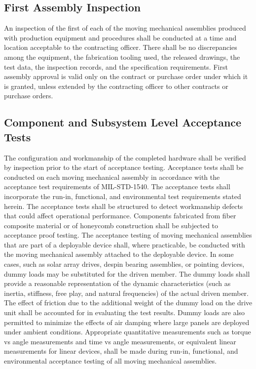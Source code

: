 \documentclass[12pt]{article}
\begin{document}
\subsection{First Assembly Inspection} %
An inspection of the first of each of the moving mechanical assemblies produced with production equipment and procedures shall be conducted at a time and location acceptable to the contracting officer. 
There shall be no discrepancies among the equipment, the fabrication tooling used, the released drawings, the test data, the inspection records, and the specification requirements. 
First assembly approval is valid only on the contract or purchase order under which it is granted, unless extended by the contracting officer to other contracts or purchase orders.

\subsection{Component and Subsystem Level Acceptance Tests} %
The configuration and workmanship of the completed hardware shall be verified by inspection prior to the start of acceptance testing.
Acceptance tests shall be conducted on each moving mechanical assembly in accordance with the acceptance test requirements of MIL-STD-1540. 
The acceptance tests shall incorporate the run-in, functional, and environmental test requirements stated herein.
The acceptance tests shall be structured to detect workmanship defects that could affect operational performance. 
Components fabricated from fiber composite material or of honeycomb construction shall be subjected to acceptance proof testing. 
The acceptance testing of moving mechanical assemblies that are part of a deployable device shall, where practicable, be conducted with the moving mechanical assembly attached to the deployable device. 
In some cases, such as solar array drives, despin bearing assemblies, or pointing devices, dummy loads may be substituted for the driven member. 
The dummy loads shall provide a reasonable representation of the dynamic characteristics (such as inertia, stiffness, free play, and natural frequencies) of the actual driven member. 
The effect of friction due to the additional weight of the dummy load on the drive unit shall be accounted for in evaluating the test results. 
Dummy loads are also permitted to minimize the effects of air damping where large panels are deployed under ambient conditions. 
Appropriate quantitative measurements such as torque vs angle measurements and time vs angle measurements, or equivalent linear measurements for linear devices, shall be made during run-in, functional, and environmental acceptance testing of all moving mechanical assemblies. 
\end{document}
